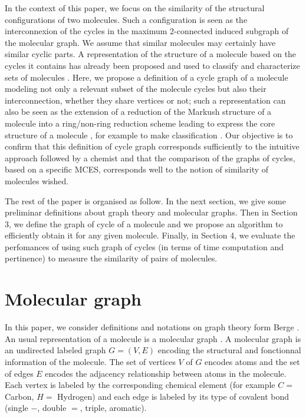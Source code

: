 \documentclass[journal=jacsat,manuscript=article]{achemso}
\begin{document}
In the context of this paper, we focus on the similarity of the structural configurations of two molecules. Such a  configuration is seen as the interconnexion of the cycles in the maximum 2-connected induced subgraph of the molecular graph. We assume that similar molecules may certainly have similar cyclic parts. A representation of the structure of a molecule based on the cycles it contains has already been proposed and used to classify and characterize sets of molecules \cite{Gauzere2013,Horvarth2004}. Here, we propose a definition of a cycle graph of a molecule modeling not only a relevant subset of the molecule cycles but also their interconnection, whether they share vertices or not; such a representation can also be seen as the extension of a reduction of the Markush structure of a molecule into a ring/non-ring reduction scheme leading to express the core structure of a molecule \cite{Lynch1996}, for example to make classification \cite{Gillet1991}. Our objective is to confirm that this definition of cycle graph corresponds sufficiently to the intuitive approach followed by a chemist and that the comparison of the graphs of cycles, based on a specific MCES, corresponds well to the notion of similarity of molecules wished.

The rest of the paper is organised as follow. In the next section, we give some preliminar definitions about graph theory and molecular graphs. Then in Section 3, we define the graph of cycle of a molecule and we propose an algorithm to efficiently obtain it for any given molecule. Finally, in Section 4, we evaluate the perfomances of using such graph of cycles (in terms of time computation and pertinence) to measure the similarity of pairs of molecules.
\section{Molecular graph}

In this paper, we consider definitions and notations on graph theory form Berge \cite{Berge1963}. An usual representation of a molecule is a molecular graph \cite{Gasteiger2003}. A molecular graph is an undirected labeled graph $G=(V,E)$ encoding the structural and fonctionnal information of the molecule. The set of vertices $V$ of $G$ encodes atoms and the set of edges $E$ encodes the adjacency relationship between atoms in the molecule. Each vertex is labeled by the corresponding chemical element (for example $C =$ Carbon, $H =$ Hydrogen) and each edge is labeled by its type of covalent bond (single $-$, double $=$, triple, aromatic).
\end{document}
